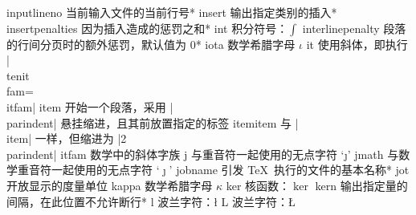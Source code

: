 \capcs inputlineno {当前输入文件的当前行号}*{}
\capcs insert {输出指定类别的插入}*{}
\capcs insertpenalties {因为插入造成的惩罚之和}*{}
\capcs int {积分符号：$\int$}{}{}
\capcs interlinepenalty {段落的行间分页时的额外惩罚，默认值为 0}*{}
\capcs iota {数学希腊字母 $\iota$}{}{}
\capcs it {使用斜体，即执行 |\\tenit\\fam=\\itfam|}{}{}
\capcs item {开始一个段落，采用 |\\parindent| 悬挂缩进，且其前放置指定的标签}{}{}
\capcs itemitem {与 |\\item| 一样，但缩进为 |2\\parindent|}{}{}
\capcs itfam {数学中的斜体字族}{}{}
\capcs j {与重音符一起使用的无点字符 `\j'}{}{}
\capcs jmath {与数学重音符一起使用的无点字符 `$\jmath$'}{}{}
\capcs jobname {引发 \TeX\ 执行的文件的基本名称}*{}
\capcs jot {开放显示的度量单位}{}{}
\capcs kappa {数学希腊字母 $\kappa$}{}{}
\capcs ker {核函数：$\ker$}{}{}
\capcs kern {输出指定量的间隔，在此位置不允许断行}*{}
\capcs l {波兰字符：\l}{}{}
\capcs L {波兰字符：\L}{}{}
